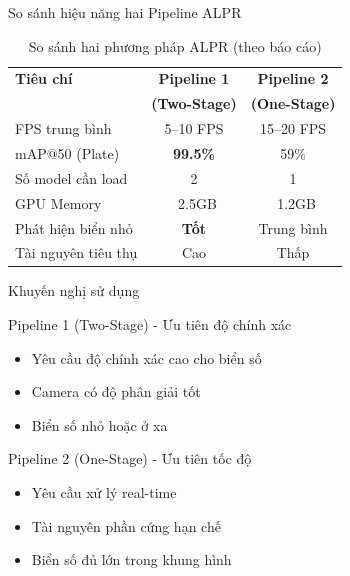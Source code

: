 \begin{frame}{So sánh hiệu năng hai Pipeline ALPR}
    \begin{table}
        \centering
        \small
        \begin{tabular}{|l|c|c|}
            \hline
            \textbf{Tiêu chí} & \textbf{Pipeline 1} & \textbf{Pipeline 2} \\
            & \textbf{(Two-Stage)} & \textbf{(One-Stage)} \\
            \hline
            FPS trung bình & 5--10 FPS & 15--20 FPS \\
            \hline
            mAP@50 (Plate) & \textbf{99.5\%} & 59\% \\
            \hline
            Số model cần load & 2 & 1 \\
            \hline
            GPU Memory & ~2.5GB & ~1.2GB \\
            \hline
            Phát hiện biển nhỏ & \textbf{Tốt} & Trung bình \\
            \hline
            Tài nguyên tiêu thụ & Cao & Thấp \\
            \hline
        \end{tabular}
        \caption{So sánh hai phương pháp ALPR (theo báo cáo)}
    \end{table}
\end{frame}

\begin{frame}{Khuyến nghị sử dụng}
    \begin{block}{Pipeline 1 (Two-Stage) - Ưu tiên độ chính xác}
    \begin{itemize}
        \item Yêu cầu độ chính xác cao cho biển số
        \item Camera có độ phân giải tốt
        \item Biển số nhỏ hoặc ở xa
    \end{itemize}
    \end{block}

    \begin{block}{Pipeline 2 (One-Stage) - Ưu tiên tốc độ}
    \begin{itemize}
        \item Yêu cầu xử lý real-time
        \item Tài nguyên phần cứng hạn chế
        \item Biển số đủ lớn trong khung hình
    \end{itemize}
    \end{block}
\end{frame}

